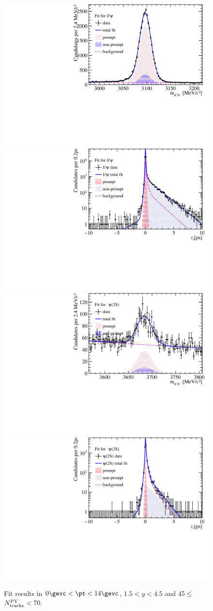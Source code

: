 \begin{figure}[H]
\begin{center}
\includegraphics[width=0.45\linewidth]{pdf/pPb/Workdir/TwoDimFit/ProjMass/Jpsi_n2y1pt1.pdf}
\includegraphics[width=0.45\linewidth]{pdf/pPb/Workdir/TwoDimFit/ProjTz/Jpsi_n2y1pt1.pdf}
\vspace*{-0.5cm}
\includegraphics[width=0.45\linewidth]{pdf/pPb/Workdir/TwoDimFit/ProjMass/Psi2S_n2y1pt1.pdf}
\includegraphics[width=0.45\linewidth]{pdf/pPb/Workdir/TwoDimFit/ProjTz/Psi2S_n2y1pt1.pdf}
\vspace*{-0.5cm}
\end{center}
\caption{Fit results in $0\gevc<\pt<14\gevc$, $1.5<y<4.5$ and 45$\leq$$N^{\rm PV}_{\rm tracks}$$<70$.}
\end{figure}

